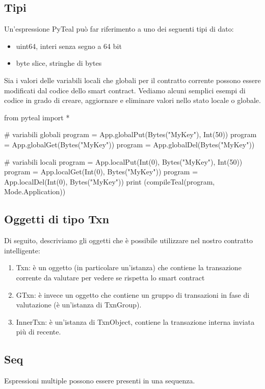 \subsection{Tipi}
Un'espressione PyTeal può far riferimento a uno dei seguenti tipi di dato: 
\begin{itemize}
    \item uint64, interi senza segno a 64 bit
    \item byte slice, stringhe di bytes
\end{itemize}
Sia i valori delle variabili locali che globali per il contratto corrente possono essere modificati dal codice dello smart contract. 
Vediamo alcuni semplici esempi di codice in grado di creare, aggiornare e eliminare valori nello stato locale o globale. 

\begin{pythoncode}
from pyteal import *

#  variabili globali
program = App.globalPut(Bytes("MyKey"), Int(50))
program = App.globalGet(Bytes("MyKey"))
program = App.globalDel(Bytes("MyKey"))

#  variabili locali
program = App.localPut(Int(0), Bytes("MyKey"), Int(50))
program = App.localGet(Int(0), Bytes("MyKey"))
program = App.localDel(Int(0), Bytes("MyKey"))
print (compileTeal(program, Mode.Application))
\end{pythoncode}
% 

\subsection{Oggetti di tipo Txn}
Di seguito, descriviamo gli oggetti che è possibile utilizzare nel nostro contratto intelligente:

\begin{enumerate}
    \item Txn: è un oggetto (in particolare un'istanza) che contiene la transazione corrente da valutare per vedere se rispetta lo smart contract
    \item GTxn: è invece un oggetto che contiene un gruppo di transazioni in fase di valutazione (è un'istanza di TxnGroup).
    \item InnerTxn: è un'istanza di TxnObject, contiene la transazione interna inviata più di recente.
\end{enumerate}

\subsection{Seq}
Espressioni multiple possono essere presenti in una sequenza.

